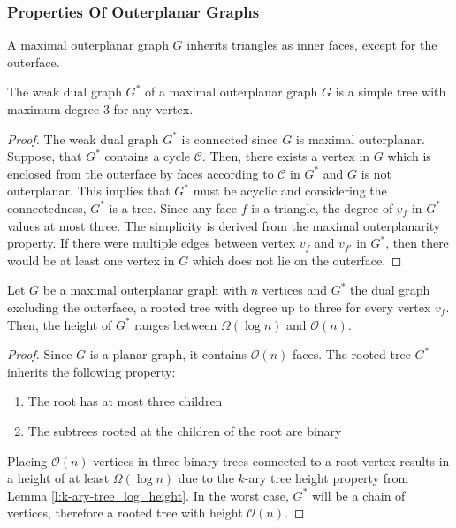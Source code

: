 \subsubsection{Properties Of Outerplanar Graphs}
\begin{lemma}
	A maximal outerplanar graph $G$ inherits triangles as inner faces, except for the outerface.
\end{lemma}
\begin{lemma}\label{l:outerplanar-dual-tree-degree-3}
	The weak dual graph $G^*$ of a maximal outerplanar graph $G$ is a simple tree with maximum degree 3 for any vertex.
\end{lemma}
\begin{proof}
	The weak dual graph $G^*$ is connected since $G$ is maximal outerplanar. Suppose, that $G^*$ contains a cycle $\mathcal{C}$. Then, there exists a vertex in $G$ which is enclosed from the outerface by faces according to $\mathcal{C}$ in $G^*$ and $G$ is not outerplanar. This implies that $G^*$ must be acyclic and considering the connectedness, $G^*$ is a tree. Since any face $f$ is a triangle, the degree of $v_f$ in $G^*$ values at most three. The simplicity is derived from the maximal outerplanarity property. If there were multiple edges between vertex $v_f$ and $v_{f'}$ in $G^*$, then there would be at least one vertex in $G$ which does not lie on the outerface.
\end{proof}
\begin{lemma}
	Let $G$ be a maximal outerplanar graph with $n$ vertices and $G^*$ the dual graph excluding the outerface, a rooted tree with degree up to three for every vertex $v_f$. Then, the height of $G^*$ ranges between $\Omega(\log n)$ and $\mathcal{O}(n)$.
\end{lemma}
\begin{proof}
	Since $G$ is a planar graph, it contains $\mathcal{O}(n)$ faces. The rooted tree $G^*$ inherits the following property:
	\begin{enumerate}
		\item The root has at most three children
		\item The subtrees rooted at the children of the root are binary
	\end{enumerate}
	Placing $\mathcal{O}(n)$ vertices in three binary trees connected to a root vertex results in a height of at least $\Omega(\log n)$ due to the $k$-ary tree height property from Lemma \ref{l:k-ary-tree_log_height}. In the worst case, $G^*$ will be a chain of vertices, therefore a rooted tree with height $\mathcal{O}(n)$.
\end{proof}

